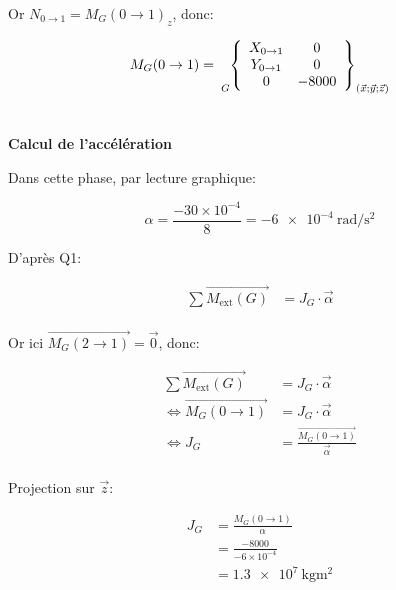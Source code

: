 \documentclass{article}
\newcommand{\torseur}[7]{
\tensor[_{#1}]{\left\{ \begin{array}{cc}
    #2 & #5 \\
    #3 & #6 \\
    #4 & #7
\end{array} \right\}}{_{(\vec{x};\vec{y};\vec{z})}}
}
\newcommand{\vect}[1]{\overrightarrow{#1}}
\begin{document}
Or $N_{0\to1} = {M_G(0\to1)}_z$, donc:

$$M_G(0\to1) = \torseur{G}{X_{0\to1}}{Y_{0\to1}}{0}{0}{0}{-8000}$$

\section{}

\textbf{Calcul de l'accélération}

Dans cette phase, par lecture graphique:

$$\alpha = \frac{-30\times10^{-4}}{8} = \SI{-6e-4}{\radian\per\second\squared}$$

D'après Q1:

\begin{equation*}
    \begin{split}
        \sum \vect{M_\text{ext}(G)} &= J_G \cdot \vec \alpha \\
    \end{split}
\end{equation*}

Or ici $\vect{M_G(2\to1)} = \vec 0$, donc:

\begin{equation*}
    \begin{split}
        \sum \vect{M_\text{ext}(G)} &= J_G \cdot \vec \alpha \\
        \iff \vect{M_G(0\to1)} &= J_G\cdot \vec\alpha \\
        \iff J_G &= \frac{\vect{M_G(0\to1)}}{\vec\alpha} \\
    \end{split}
\end{equation*}

Projection sur $\vec z$:

\begin{equation*}
    \begin{split}
        J_G &= \frac{M_G(0\to1)}{\alpha} \\
        &= \frac{-8000}{-6\times10^{-4}} \\
        &= \SI{1.3e7}{\kilo\gram\meter\squared}
    \end{split}
\end{equation*}
\end{document}
